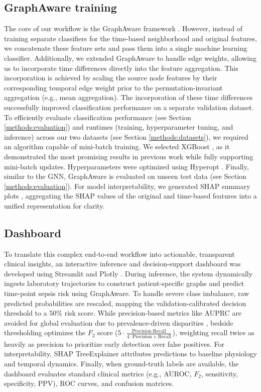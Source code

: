 \documentclass[pdflatex,sn-mathphys-num,lineno]{sn-jnl}
\theoremstyle{thmstyleone}%
\theoremstyle{thmstyletwo}%
\theoremstyle{thmstylethree}%
\begin{document}
\subsection{GraphAware training}\label{methods:graphaware}
The core of our workflow is the GraphAware framework \cite{walke2026graphaware}. However, instead of training separate classifiers for the time-based neighborhood and original features, we concatenate these feature sets and pass them into a single machine learning classifier. Additionally, we extended GraphAware to handle edge weights, allowing us to incorporate time differences directly into the feature aggregation. This incorporation is achieved by scaling the source node features by their corresponding temporal edge weight prior to the permutation-invariant aggregation (e.g., mean aggregation). The incorporation of these time differences successfully improved classification performance on a separate validation dataset. To efficiently evaluate classification performance (see Section \ref{methods:evaluation}) and runtimes (training, hyperparameter tuning, and inference) across our two datasets (see Section \ref{methods:datasets}), we required an algorithm capable of mini-batch training. We selected XGBoost \cite{Chen2016}, as it demonstrated the most promising results in previous work \cite{walke2025sbc} while fully supporting mini-batch updates. Hyperparameters were optimized using Hyperopt \cite{Bergstra2013}. Finally, similar to the GNN, GraphAware is evaluated on unseen test data (see Section\,\ref{methods:evaluation}). For model interpretability, we generated SHAP summary plots \cite{NIPS2017_7062}, aggregating the SHAP values of the original and time-based features into a unified representation for clarity.

\subsection{Dashboard}\label{methods:dashboard}
To translate this complex end-to-end workflow into actionable, transparent clinical insights, an interactive inference and decision-support dashboard was developed using Streamlit \cite{streamlit} and Plotly \cite{plotly-source_2026}. During inference, the system dynamically ingests laboratory trajectories to construct patient-specific graphs and predict time-point sepsis risk using GraphAware. To handle severe class imbalance, raw predicted probabilities are rescaled, mapping the validation-calibrated decision threshold to a 50\% risk score. While precision-based metrics like AUPRC are avoided for global evaluation due to prevalence-driven disparities \cite{NEURIPS2024_4df3510a}, bedside thresholding optimizes the $F_2$ score ($5 \cdot \frac{\text{Precision} \cdot \text{Recall}}{4 \cdot \text{Precision} + \text{Recall}}$), weighting recall twice as heavily as precision to prioritize early detection over false positives. For interpretability, SHAP TreeExplainer \cite{NIPS2017_7062} attributes predictions to baseline physiology and temporal dynamics. Finally, when ground-truth labels are available, the dashboard evaluates standard clinical metrics (e.g., AUROC, $F_2$, sensitivity, specificity, PPV), ROC curves, and confusion matrices.
\end{document}
